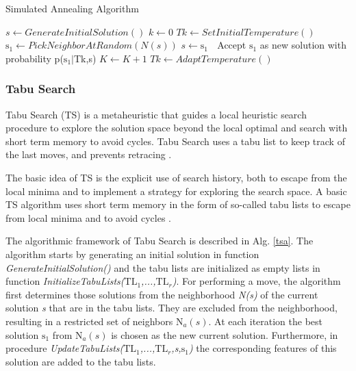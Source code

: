 \begin{algorithm}[h]
  \caption{Simulated Annealing Algorithm}\label{sa}
  \begin{algorithmic}[1]
    
    \State $s\gets GenerateInitialSolution()$
    \State $k\gets 0 $
    \State $Tk\gets SetInitialTemperature()$
    \State $\mbox{s}_1\gets PickNeighborAtRandom(N (s))$
    \State $s\gets\mbox{s}_1$
    \Else $\;$ Accept $\mbox{s}_1$ as new solution with probability p($\mbox{s}_1|$Tk,s) 
    \EndIf
    \State $K\gets K+1$
    \State $Tk\gets AdaptTemperature()$
    \EndWhile
      
  \end{algorithmic}
\end{algorithm}

\subsubsection{Tabu Search}

Tabu Search (TS) is a metaheuristic that guides a local heuristic search procedure to explore the solution space beyond the local optimal and search with short term memory to avoid cycles. Tabu Search uses a  tabu list to keep track of the last  moves, and prevents retracing \citep{Glover1986}.

The basic idea of TS is the explicit use of search history, both to escape
from the local minima and to implement a strategy for exploring the search space.
A basic TS algorithm uses short term memory in the form of so-called
tabu lists to escape from local minima and to avoid cycles \citep{Tobergte2013}.

The algorithmic framework of Tabu Search is described in Alg. \ref{tsa}.  The algorithm starts by generating an initial solution in function \textit{GenerateInitialSolution()} and the tabu lists are initialized as empty lists in function \textit{InitializeTabuLists($\mbox{TL}_1$,...,$\mbox{TL}_r$)}. For performing a move, the algorithm first determines those solutions from the neighborhood \textit{N(s)} of the current solution \textit{s} that are in the tabu lists. They are excluded from the neighborhood, resulting in a restricted set of neighbors \textit{$\mbox{N}_a(s)$}. At each iteration the best solution \textit{$\mbox{s}_1$} from \textit{$\mbox{N}_a(s)$} is chosen as the new current solution. Furthermore, in procedure \textit{UpdateTabuLists($\mbox{TL}_1$,...,$\mbox{TL}_r$,s,$\mbox{s}_1$)} the corresponding features of this solution are added to the tabu lists.


